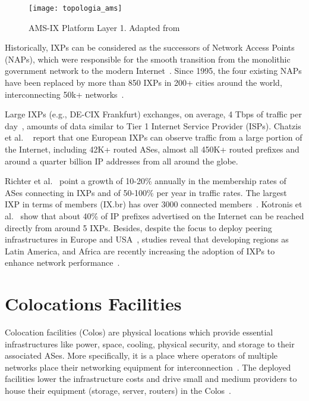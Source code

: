 	\begin{figure}[t]
	    \centering
	    \texttt{[image: topologia\_ams]}
	    \caption{AMS-IX Platform Layer 1. Adapted from~\cite{amsixinfra}}
	    \label{fig:ixp-topology}
	\end{figure}

	Historically, IXPs can be considered as the successors of Network Access Points (NAPs), which were responsible for the smooth transition from the monolithic government network to the modern Internet~\cite{Chatzis:2013}. Since 1995, the four existing NAPs have been replaced by more than 850 IXPs in 200+ cities around the world, interconnecting 50k+ networks~\cite{internetexchangemap, Giotsas:2015:MPI:2716281.2836122}.

	Large IXPs (e.g., DE-CIX Frankfurt) exchanges, on average, 4 Tbps of traffic per day~\cite{decixstatistics}, amounts of data similar to Tier 1 Internet Service Provider (ISPs). Chatzis et al. ~\cite{Chatzis:2013:BUL:2504730.2504746} report that one European IXPs can observe traffic from a large portion of the Internet, including 42K+ routed ASes, almost all 450K+ routed prefixes and around a quarter billion IP addresses from all around the globe. 

	Richter et al.~\cite{Richter:2014} point a growth of 10-20\% annually in the membership rates of ASes connecting in IXPs and of 50-100\% per year in traffic rates. The largest IXP in terms of members (IX.br) has over 3000 connected members~\cite{ixbrmembros}. Kotronis et al.~\cite{Kotronis:2015:IPI:2745844.2745877} show that about 40\% of IP prefixes advertised on the Internet can be reached directly from around 5 IXPs. Besides, despite the focus to deploy peering infrastructures in Europe and USA~\cite{Chatzis:2013, Chatzis:2015:QVO:2717646.2717650}, studies reveal that developing regions as Latin America, and Africa are recently increasing the adoption of IXPs to enhance network performance~\cite{DissectingBrazilianIXP, Fanou:2017:ICC:3131365.3131394}.


	\section{Colocations Facilities}
	\label{subsec:colos}

	Colocation facilities (Colos) are physical locations which provide essential infrastructures like power, space, cooling, physical security, and storage to their associated ASes. More specifically, it is a place where operators of multiple networks place their networking equipment for interconnection~\cite{BITAG}. The deployed facilities lower the infrastructure costs and drive small and medium providers to house their equipment (storage, server, routers) in the Colos~\cite{Kotronis:2017:STC:3131365.3131388}.

